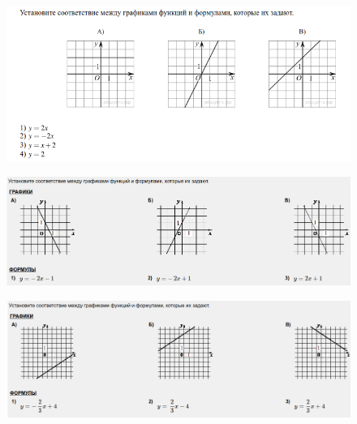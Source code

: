 
\begin{figure}[h!]
	\centering
	\includegraphics[width=1\textwidth]{img/lin1.png}
\end{figure}

\begin{figure}[h!]
	\centering
	\includegraphics[width=1\textwidth]{img/lin_task2.png}
\end{figure}

\begin{figure}[h!]
	\centering
	\includegraphics[width=1\textwidth]{img/lin_task3.png}
\end{figure}